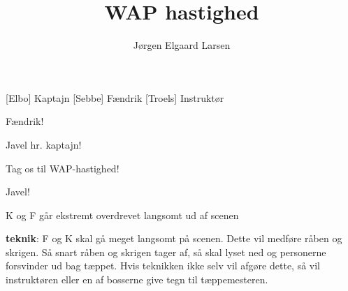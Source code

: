 \documentclass[a4paper,11pt]{article}
\title{WAP hastighed}
\author{Jørgen Elgaard Larsen}
\begin{document}
\maketitle

\begin{roles}
[Elbo] Kaptajn
[Sebbe] Fændrik
[Troels] Instruktør
\end{roles}

\begin{sketch}


   Fændrik!

   Javel hr. kaptajn!

   Tag os til WAP-hastighed!

 Javel!

\scene K og F går ekstremt overdrevet langsomt ud af scenen

\scene \textbf{teknik}: F og K skal gå meget langsomt på scenen. Dette
vil medføre råben og skrigen. Så snart råben og skrigen tager af, så
skal lyset ned og personerne forsvinder ud bag tæppet. Hvis teknikken
ikke selv vil afgøre dette, så vil instruktøren eller en af bosserne
give tegn til tæppemesteren.

\end{sketch}
\end{document}

